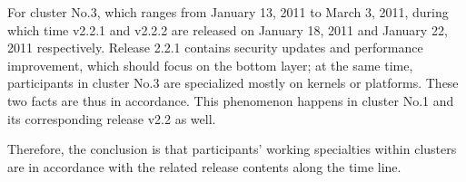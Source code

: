 \documentclass[10pt, conference, compsocconf]{IEEEtran}
\begin{document}
For cluster No.3, which ranges from January 13, 2011 to March 3, 2011,
during which time v2.2.1 and v2.2.2 are released on January 18, 2011
and January 22, 2011 respectively. Release 2.2.1 contains security
updates and performance improvement, which should focus on the bottom
layer; at the same time, participants in cluster No.3 are specialized
mostly on kernels or platforms. These two facts are thus in
accordance. This phenomenon happens in cluster No.1 and its
corresponding release v2.2 as well.


Therefore, the conclusion is that participants' working specialties
within clusters are in accordance with the related release contents
along the time line.

%
%



%
%
\end{document}
